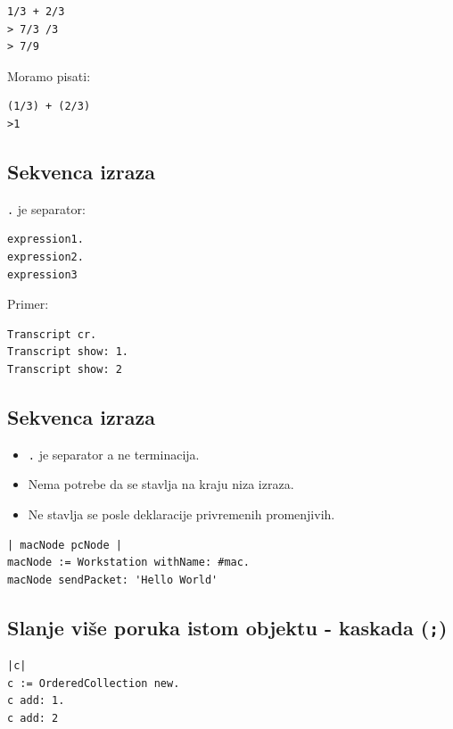 \documentclass[presentation]{beamer}
\begin{document}
\begin{verbatim}
1/3 + 2/3
> 7/3 /3
> 7/9
\end{verbatim}

Moramo pisati:

\begin{verbatim}
(1/3) + (2/3)
>1
\end{verbatim}

\subsection{Sekvenca izraza}
\label{sec:org6fab431}

\texttt{.} je separator:

\begin{verbatim}
expression1.
expression2.
expression3
\end{verbatim}

Primer:

\begin{verbatim}
Transcript cr.
Transcript show: 1.
Transcript show: 2
\end{verbatim}

\subsection{Sekvenca izraza}
\label{sec:orga467273}

\begin{itemize}
\item \texttt{.} je separator a ne terminacija.
\item Nema potrebe da se stavlja na kraju niza izraza.
\item Ne stavlja se posle deklaracije privremenih promenjivih.
\end{itemize}

\begin{verbatim}
| macNode pcNode |
macNode := Workstation withName: #mac.
macNode sendPacket: 'Hello World'
\end{verbatim}

\subsection{Slanje više poruka istom objektu - kaskada (\texttt{;})}
\label{sec:orgdac85cc}

\begin{verbatim}
|c|
c := OrderedCollection new.
c add: 1.
c add: 2
\end{verbatim}
\end{document}
